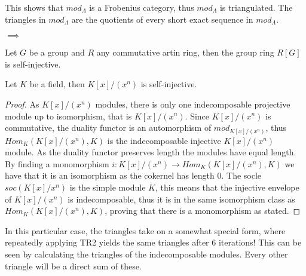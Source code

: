     This shows that $mod_{\Lambda}$ is a Frobenius category, thus \underline{$mod_{\Lambda}$} is triangulated. The triangles in \underline{$mod_{\Lambda}$} are the quotients of every short exact sequence in $mod_{\Lambda}$.
    \begin{center}
        $\implies$
    \end{center}

    \begin{prop}
        Let $G$ be a group and $R$ any commutative artin ring, then the group ring $R[G]$ is self-injective.
    \end{prop}


    \begin{prop}
        Let $K$ be a field, then $K[x]/(x^n)$ is self-injective.
    \end{prop}

    \begin{proof}
        As $K[x]/(x^n)$ modules, there is only one indecomposable projective module up to isomorphism, that is $K[x]/(x^n)$. Since $K[x]/(x^n)$ is commutative, the duality functor is an automorphism of $mod_{K[x]/(x^n)}$, thus $Hom_K(K[x]/(x^n),K)$ is the indecomposable injective $K[x]/(x^n)$ module. As the duality functor preserves length the modules have equal length. By finding a monomorphism $i:K[x]/(x^n)\rightarrow Hom_K(K[x]/(x^n),K)$ we have that it is an isomorphism as the cokernel has length $0$. The socle $soc(K[x]/x^n)$ is the simple module $K$, this means that the injective envelope of $K[x]/(x^n)$ is indecomposable, thus it is in the same isomorphism class as $Hom_K(K[x]/(x^n),K)$, proving that there is a monomorphism as stated.
    \end{proof}

    In this particular case, the triangles take on a somewhat special form, where repeatedly applying TR2 yields the same triangles after 6 iterations! This can be seen by calculating the triangles of the indecomposable modules. Every other triangle will be a direct sum of these. \\

